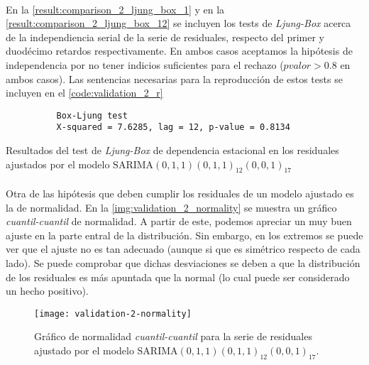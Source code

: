 \documentclass[a4paper, spanish]{article}
\begin{document}
      \paragraph{}
      En la \autoref{result:comparison_2_ljung_box_1} y en la \autoref{result:comparison_2_ljung_box_12} se incluyen los tests de \emph{Ljung-Box} acerca de la independiencia serial de la serie de residuales, respecto del primer y duodécimo retardos respectivamente. En ambos casos aceptamos la hipótesis de independencia por no tener indicios suficientes para el rechazo ($pvalor > 0.8$ en ambos casos). Las sentencias necesarias para la reproducción de estos tests se incluyen en el \autoref{code:validation_2_r}

      \begin{table}[htb!]
        \begin{Verbatim}
          Box-Ljung test
          X-squared = 7.6285, lag = 12, p-value = 0.8134
        \end{Verbatim}
        \caption{Resultados del test de \emph{Ljung-Box} de dependencia estacional en los residuales ajustados por el modelo $\text{SARIMA}(0, 1, 1)(0, 1, 1)_{12}(0, 0, 1)_{17}$}
        \label{result:comparison_2_ljung_box_12}
      \end{table}

      \paragraph{}
      Otra de las hipótesis que deben cumplir los residuales de un modelo ajustado es la de normalidad. En la \autoref{img:validation_2_normality} se muestra un gráfico \emph{cuantil-cuantil} de normalidad. A partir de este, podemos apreciar un muy buen ajuste en la parte entral de la distribución. Sin embargo, en los extremos se puede ver que el ajuste no es tan adecuado (aunque si que es simétrico respecto de cada lado). Se puede comprobar que dichas desviaciones se deben a que la distribución de los residuales es más apuntada que la normal (lo cual puede ser considerado un hecho positivo).

      \begin{figure}[htb!]
        \centering
        \texttt{[image: validation-2-normality]}
        \caption{Gráfico de normalidad \emph{cuantil-cuantil} para la serie de residuales ajustado por el modelo $\text{SARIMA}(0, 1, 1)(0, 1, 1)_{12}(0, 0, 1)_{17}$.}
        \label{img:validation_2_normality}
      \end{figure}
\end{document}
